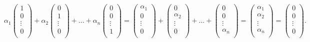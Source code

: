 \begin{example}
$\alpha_1 \begin{pmatrix}
		1  \\
		0  \\
		\vdots  \\
		0  \\
	\end{pmatrix} + \alpha_2 \begin{pmatrix}
		0  \\
		1  \\
		\vdots  \\
		0  \\
	\end{pmatrix} + ... + \alpha_n \begin{pmatrix}
		0  \\
		0  \\
		\vdots  \\
		1  \\
	\end{pmatrix} 
	=
	\begin{pmatrix}
		\alpha_1  \\
		0  \\
		\vdots  \\
		0  \\
	\end{pmatrix} + \begin{pmatrix}
		0  \\
		\alpha_2  \\
		\vdots  \\
		0  \\
	\end{pmatrix} + ... + \begin{pmatrix}
		0  \\
		0  \\
		\vdots  \\
		\alpha_n  \\
	\end{pmatrix}
	=
	\begin{pmatrix}
		\alpha_1  \\
		\alpha_2  \\
		\vdots  \\
		\alpha_n  \\
	\end{pmatrix}
	=
	\begin{pmatrix}
		0  \\
		0  \\
		\vdots  \\
		0  \\
	\end{pmatrix}.$


\end{example}
